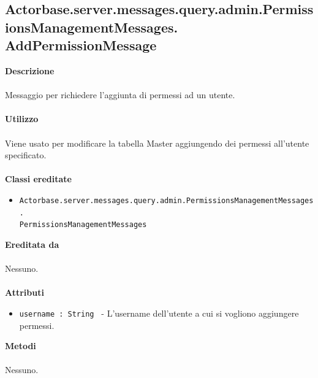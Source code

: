 \documentclass[a4paper]{article}
\begin{document}
\subsection{Actorbase.server.messages.query.admin.PermissionsManagementMessages.
\newline AddPermissionMessage}
		\textbf{Descrizione}
			\\ \\
			Messaggio per richiedere l'aggiunta di permessi ad un utente.
			\\ \\
		\textbf{Utilizzo}
			\\ \\
			Viene usato per modificare la tabella Master aggiungendo dei permessi all'utente specificato.
			\\ \\
		\textbf{Classi ereditate}
			\begin{itemize}
				\item \texttt{Actorbase.server.messages.query.admin.PermissionsManagementMessages.}
				\\ \texttt{PermissionsManagementMessages}
			\end{itemize}
		\textbf{Ereditata da}
			\\ \\
			Nessuno.
			\\ \\
		\textbf{Attributi}
			\begin{itemize}
				\item \texttt{username : String } - L'username dell'utente a cui si vogliono aggiungere permessi.
			\end{itemize}
		\textbf{Metodi}
			\\ \\
			Nessuno.
			
\end{document}
